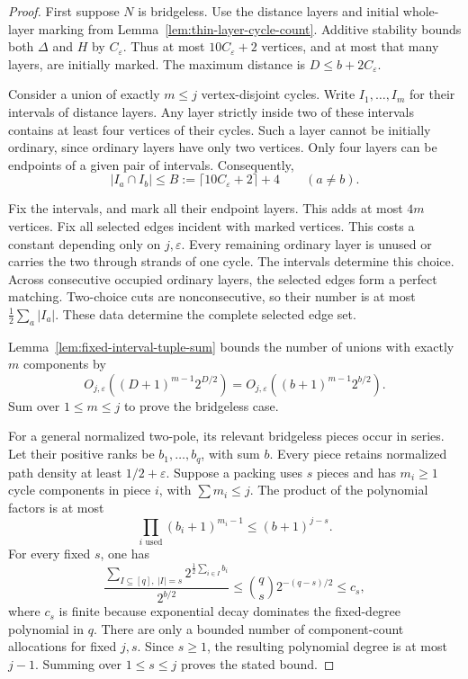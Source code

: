 \begin{proof}
First suppose $N$ is bridgeless.
Use the distance layers and initial whole-layer marking from Lemma~\ref{lem:thin-layer-cycle-count}.
Additive stability bounds both $\Delta$ and $H$ by $C_\varepsilon$.
Thus at most $10C_\varepsilon+2$ vertices, and at most that many layers, are initially marked.
The maximum distance is $D\le b+2C_\varepsilon$.

Consider a union of exactly $m\le j$ vertex-disjoint cycles.
Write $I_1,\ldots,I_m$ for their intervals of distance layers.
Any layer strictly inside two of these intervals contains at least four vertices of their cycles.
Such a layer cannot be initially ordinary, since ordinary layers have only two vertices.
Only four layers can be endpoints of a given pair of intervals.
Consequently,
\[
 |I_a\cap I_b|\le B:=\lceil10C_\varepsilon+2\rceil+4
 \qquad(a\ne b).
\]

Fix the intervals, and mark all their endpoint layers.
This adds at most $4m$ vertices.
Fix all selected edges incident with marked vertices.
This costs a constant depending only on $j,\varepsilon$.
Every remaining ordinary layer is unused or carries the two through strands of one cycle.
The intervals determine this choice.
Across consecutive occupied ordinary layers, the selected edges form a perfect matching.
Two-choice cuts are nonconsecutive, so their number is at most $\tfrac12\sum_a|I_a|$.
These data determine the complete selected edge set.

Lemma~\ref{lem:fixed-interval-tuple-sum} bounds the number of unions with exactly $m$ components by
\[
 O_{j,\varepsilon}((D+1)^{m-1}2^{D/2})
 =O_{j,\varepsilon}((b+1)^{m-1}2^{b/2}).
\]
Sum over $1\le m\le j$ to prove the bridgeless case.

For a general normalized two-pole, its relevant bridgeless pieces occur in series.
Let their positive ranks be $b_1,\ldots,b_q$, with sum $b$.
Every piece retains normalized path density at least $1/2+\varepsilon$.
Suppose a packing uses $s$ pieces and has $m_i\ge1$ cycle components in piece $i$, with $\sum m_i\le j$.
The product of the polynomial factors is at most
\[
 \prod_{i\text{ used}}(b_i+1)^{m_i-1}
 \le(b+1)^{j-s}.
\]
For every fixed $s$, one has
\[
 \frac{\displaystyle\sum_{I\subseteq[q],\ |I|=s}
             2^{\frac12\sum_{i\in I}b_i}}
      {2^{b/2}}
 \le\binom qs2^{-(q-s)/2}\le c_s,
\]
where $c_s$ is finite because exponential decay dominates the fixed-degree polynomial in $q$.
There are only a bounded number of component-count allocations for fixed $j,s$.
Since $s\ge1$, the resulting polynomial degree is at most $j-1$.
Summing over $1\le s\le j$ proves the stated bound.


\end{proof}
